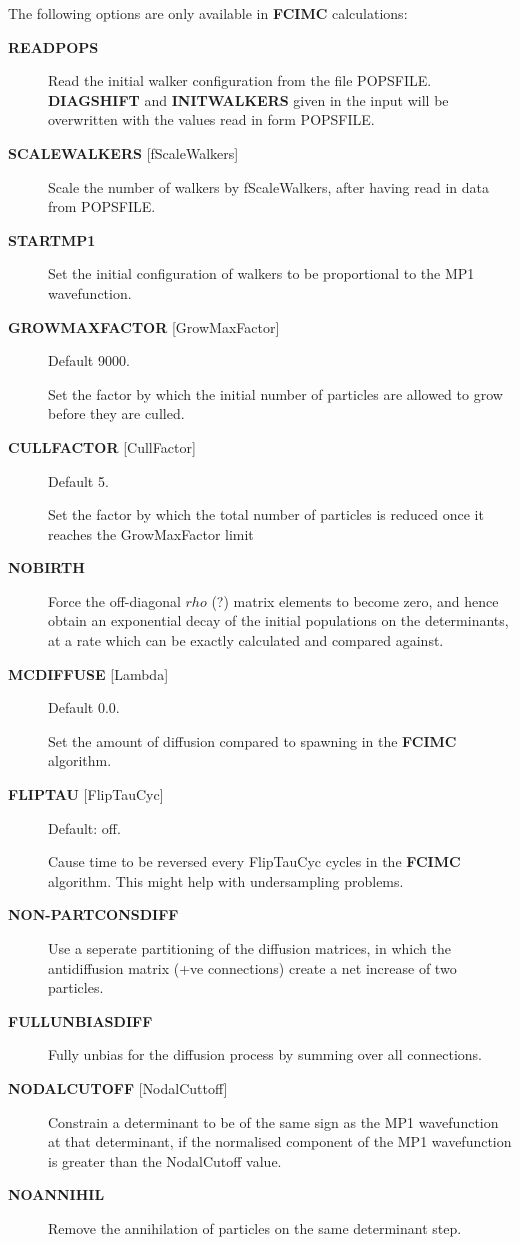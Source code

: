 \documentclass[openany,a4paper,10pt]{manual}
\begin{document}
The following options are only available in \textbf{FCIMC} calculations:
\begin{description}
\item[\textbf{READPOPS}]
Read the initial walker configuration from the file POPSFILE.
\textbf{DIAGSHIFT} and \textbf{INITWALKERS} given in the input will be
overwritten with the values read in form POPSFILE.

\item[\textbf{SCALEWALKERS} {[}fScaleWalkers{]}]
Scale the number of walkers by fScaleWalkers, after having read in data from POPSFILE.

\item[\textbf{STARTMP1}]
Set the initial configuration of walkers to be proportional to the MP1 wavefunction.

\item[\textbf{GROWMAXFACTOR} {[}GrowMaxFactor{]}]
Default 9000.

Set the factor by which the initial number of particles are allowed to grow before
they are culled.

\item[\textbf{CULLFACTOR} {[}CullFactor{]}]
Default 5.

Set the factor by which the total number of particles is reduced once it reaches the GrowMaxFactor limit

\item[\textbf{NOBIRTH}]
Force the off-diagonal $rho$ (?) matrix elements to become zero,
and hence obtain an exponential decay of the initial populations
on the determinants, at a rate which can be exactly calculated and
compared against.

\item[\textbf{MCDIFFUSE} {[}Lambda{]}]
Default 0.0.

Set the amount of diffusion compared to spawning in the \textbf{FCIMC} algorithm.

\item[\textbf{FLIPTAU} {[}FlipTauCyc{]}]
Default: off.

Cause time to be reversed every FlipTauCyc cycles in the \textbf{FCIMC}
algorithm. This might help with undersampling problems.

\item[\textbf{NON-PARTCONSDIFF}]
Use a seperate partitioning of the diffusion matrices, in which
the antidiffusion matrix (+ve connections) create a net increase of
two particles.

\item[\textbf{FULLUNBIASDIFF}]
Fully unbias for the diffusion process by summing over all connections.

\item[\textbf{NODALCUTOFF} {[}NodalCuttoff{]}]
Constrain a determinant to be of the same sign as the MP1
wavefunction at that determinant, if the normalised component of
the MP1 wavefunction is greater than the NodalCutoff value.

\item[\textbf{NOANNIHIL}]
Remove the annihilation of particles on the same
determinant step.

\end{description}
\end{document}

